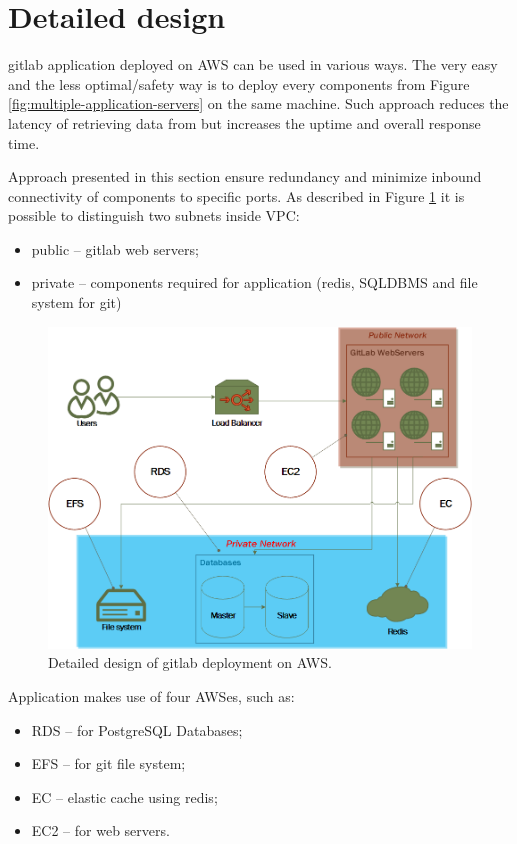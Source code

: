 \section{Detailed design} \label{s:general-approach:detailed-design}
	\gls{gitlab} application deployed on \gls{AWS} can be used in various ways. The very easy and the less optimal/safety way is to deploy every components from Figure \ref{fig:multiple-application-servers} on the same machine. Such approach reduces the latency of retrieving data from but increases the uptime and overall response time.
	
	Approach presented in this section ensure redundancy and minimize inbound connectivity of components to specific ports. As described in Figure \ref{fig:detailed-design} it is possible to distinguish two subnets inside \gls{VPC}:
	\begin{itemize}
		\item public -- \gls{gitlab} web servers;
		\item private -- components required for application (\gls{redis}, \gls{SQLDBMS} and file system for \gls{git})
	\end{itemize}	
	\begin{figure}[!htbp]
		\centering
		\includegraphics[width=1\textwidth]{img/detailed-model2}
		\caption{Detailed design of \gls{gitlab} deployment on \gls{AWS}.}
		\label{fig:detailed-design}
	\end{figure}
	Application makes use of four \gls{AWS}es, such as:
	\begin{itemize}
		\item
		{
			\gls{RDS} -- for PostgreSQL Databases;
		}
		\item
		{
			\gls{EFS} -- for \gls{git} file system;
		}
		\item
		{
			\gls{EC} -- elastic cache using \gls{redis};
		}
		\item
		{
			\gls{EC2} -- for web servers.
		}
	\end{itemize}

